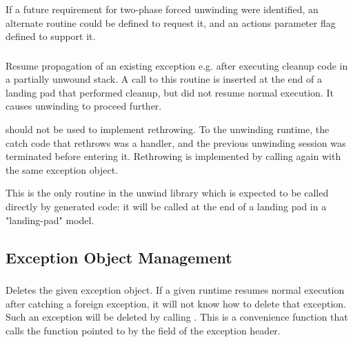 If a future requirement for two-phase forced unwinding were identified,
an alternate routine could be defined to request it, and an actions
parameter flag defined to support it.

\subsubsection{}


Resume propagation of an existing exception e.g. after executing cleanup
code in a partially unwound stack. A call to this routine is inserted
at the end of a landing pad that performed cleanup, but did not resume
normal execution. It causes unwinding to proceed further.

 should not be used to implement rethrowing.
To the unwinding runtime, the catch code that rethrows was a handler,
and the previous unwinding session was terminated before entering it.
Rethrowing is implemented by calling 
again with the same exception object.

This is the only routine in the unwind library which is expected
to be called directly by generated code: it will be called at the
end of a landing pad in a "landing-pad" model.

\subsection{Exception Object Management}

\subsubsection{}


Deletes the given exception object. If a given runtime resumes normal
execution after catching a foreign exception, it will not know how to
delete that exception. Such an exception will be deleted by calling
. This is a convenience function that calls
the function pointed to by the  field of the exception
header.

